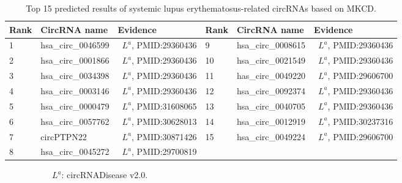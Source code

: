 \documentclass[journal,twoside,web]{ieeecolor}
\begin{document}
\begin{table}[!t]
	\centering
	\renewcommand{\arraystretch}{1.2}
	\begin{threeparttable}[b]
        \caption{Top 15 predicted results of systemic lupus erythematosus-related circRNAs based on MKCD.}	
        \label{tab:04}
		\begin{tabular}{p{1cm}<{\centering}  p{2.2cm}<{\centering} p{3.5cm}<{\centering} | p{1cm}<{\centering} p{2.2cm}<{\centering} p{3.5cm}<{\centering}}
            \hline
            Rank & CircRNA name & Evidence & Rank &	CircRNA name & Evidence \\
            \hline
            1 & hsa\_circ\_0046599 & \ $L^a$, PMID:29360436 & 9 & hsa\_circ\_0008615 & \ $L^a$, PMID:29360436 \\
            2 & hsa\_circ\_0001866 & \ $L^a$, PMID:29360436 & 10 & hsa\_circ\_0021549 & \ $L^a$, PMID:29360436 \\
            3 & hsa\_circ\_0034398 & \ $L^a$, PMID:29360436 & 11 & has\_circ\_0049220 & \ $L^a$, PMID:29606700 \\
            4 & hsa\_circ\_0003146 & \ $L^a$, PMID:29360436 & 12 & hsa\_circ\_0092374 & \ $L^a$, PMID:29360436 \\
            5 & hsa\_circ\_0000479 & \ $L^a$, PMID:31608065 & 13 & hsa\_circ\_0040705 & \ $L^a$, PMID:29360436 \\
            6 & hsa\_circ\_0057762 & \ $L^a$, PMID:30628013 & 14 & hsa\_circ\_0012919 & \ $L^a$, PMID:30237316 \\
            7 & circPTPN22 & \ $L^a$, PMID:30871426 & 15 & hsa\_circ\_0049224 & \ $L^a$, PMID:29606700 \\
            8 & hsa\_circ\_0045272 & \ $L^a$, PMID:29700819 & & & \\
            \hline
		\end{tabular}
	\end{threeparttable}
    \begin{flushleft}
        \ \ \ \ \ \ \ \ \ \ \ $L^a$: circRNADisease v2.0.
    \end{flushleft}
    \vspace{-0.4cm}
\end{table}
\end{document}
